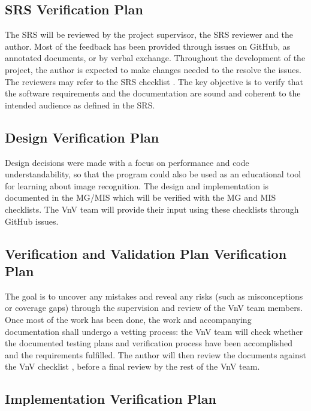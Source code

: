 \documentclass[12pt, titlepage]{article}
\begin{document}
\subsection{SRS Verification Plan}

The SRS will be reviewed by the project supervisor, the SRS reviewer and the author. Most of the feedback has been provided 
through issues on GitHub, as annotated documents, or by verbal exchange. 
Throughout the development of the project, the author is expected 
to make changes needed to the resolve the issues. The reviewers may refer to the SRS checklist \citep{SRS_checklist}.
The key objective is to verify that the software requirements and the documentation are sound 
and coherent to the intended audience as defined in the SRS.

\subsection{Design Verification Plan}

Design decisions were made with a focus on performance and code understandability, so that the program could also be used 
as an educational tool for learning about image recognition. The design and implementation is documented in the 
MG\citep{MG}/MIS\citep{MIS} which will be verified with the MG 
and MIS \citep{MG_checklist, MIS_checklist} checklists.
The VnV team will provide their input using these checklists through GitHub issues. 

\subsection{Verification and Validation Plan Verification Plan}

The goal is to uncover any mistakes and reveal any risks (such as misconceptions or coverage gaps) 
through the supervision and 
review of the VnV team members. Once most of the work has been done, the work and
accompanying documentation shall undergo a vetting process: the VnV team
will check whether the documented testing plans and verification process have been 
accomplished and the requirements fulfilled. The author will then review the documents
against the VnV checklist \citep{VnV_checklist}, before a final review by the rest of the VnV team.

\subsection{Implementation Verification Plan}
\end{document}
